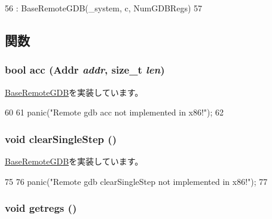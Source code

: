 \begin{DoxyCode}
56     : BaseRemoteGDB(_system, c, NumGDBRegs)
57 {}
\end{DoxyCode}


\subsection{関数}
\hypertarget{classX86ISA_1_1RemoteGDB_ac4c7be164f087f2f53d137d9768809a7}{
\subsubsection[{acc}]{\setlength{\rightskip}{0pt plus 5cm}bool acc ({\bf Addr} {\em addr}, \/  size\_\-t {\em len})}}
\label{classX86ISA_1_1RemoteGDB_ac4c7be164f087f2f53d137d9768809a7}


\hyperlink{classBaseRemoteGDB_ac0968a34e271b194ce3e808a2252d6a3}{BaseRemoteGDB}を実装しています。


\begin{DoxyCode}
60 {
61     panic("Remote gdb acc not implemented in x86!\n");
62 }
\end{DoxyCode}
\hypertarget{classX86ISA_1_1RemoteGDB_afd89268069d9026378b06b08c97f65f8}{
\subsubsection[{clearSingleStep}]{\setlength{\rightskip}{0pt plus 5cm}void clearSingleStep ()}}
\label{classX86ISA_1_1RemoteGDB_afd89268069d9026378b06b08c97f65f8}


\hyperlink{classBaseRemoteGDB_a69f1887d1310ab6f19cf5bbcdf9d7a1e}{BaseRemoteGDB}を実装しています。


\begin{DoxyCode}
75 {
76     panic("Remote gdb clearSingleStep not implemented in x86!\n");
77 }
\end{DoxyCode}
\hypertarget{classX86ISA_1_1RemoteGDB_a62bc8adc5a48f1cbb5eb9bb64301d38d}{
\subsubsection[{getregs}]{\setlength{\rightskip}{0pt plus 5cm}void getregs ()}}
\label{classX86ISA_1_1RemoteGDB_a62bc8adc5a48f1cbb5eb9bb64301d38d}



